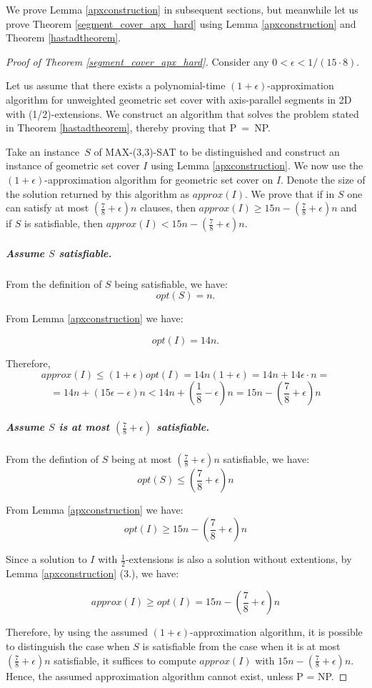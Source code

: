 We prove Lemma \ref{apxconstruction} in
subsequent sections, but meanwhile let us prove
Theorem \ref{segment_cover_apx_hard} using Lemma \ref{apxconstruction}
and Theorem \ref{hastadtheorem}.

\begin{proof}[Proof of Theorem \ref{segment_cover_apx_hard}]\leavevmode

Consider any $0 < \epsilon < 1/(15 \cdot 8)$.

Let us assume that there exists a polynomial-time
$(1+\epsilon)$-approximation algorithm
for unweighted geometric set cover with axis-parallel segments in 2D
with (1/2)-extensions.
We construct an algorithm that solves the problem stated in 
Theorem \ref{hastadtheorem}, thereby proving that P~=~NP.

Take an instance~$S$ of MAX-(3,3)-SAT to be distinguished
and construct an instance of geometric set cover $I$
using Lemma \ref{apxconstruction}.
We now use the $(1+\epsilon)$-approximation algorithm
for geometric set cover on $I$.
Denote the size of the solution returned by this algorithm as $approx(I)$.
We prove that 
if in $S$
one can satisfy at most $(\frac{7}{8}+\epsilon)n$ clauses,
then $approx(I) \ge 15n - (\frac{7}{8} + \epsilon)n$
and if $S$ is
satisfiable, then $approx(I) < 15n - (\frac{7}{8} + \epsilon)n$.

\subparagraph{Assume $S$ satisfiable.}
From the definition of $S$ being satisfiable, we have:
$$opt(S) = n.$$

From Lemma \ref{apxconstruction} we have:

$$opt(I) = 14n.$$

Therefore,
$$approx(I) \le (1+\epsilon)opt(I) = 14n(1+\epsilon)
	= 14n + 14\epsilon\cdot n =$$ 
	$$= 14n + (15\epsilon - \epsilon)n < 
  14n + \left(\frac{1}{8} - \epsilon\right)n 
= 15n - \left(\frac{7}{8} + \epsilon\right)n$$

\subparagraph{Assume $S$ is at most 
$\left(\frac{7}{8} + \epsilon\right)$ satisfiable.}
From the defintion of $S$ being at most 
$\left(\frac{7}{8} + \epsilon\right)n$ satisfiable, we have:
$$opt(S) \le \left(\frac{7}{8} + \epsilon\right)n$$

From Lemma \ref{apxconstruction} we have:
$$opt(I) \ge 15n - \left(\frac{7}{8} + \epsilon\right)n$$

Since a solution to $I$ with $\frac{1}{2}$-extensions is
also a solution without extentions, by 
Lemma \ref{apxconstruction} (3.), we have:

$$approx(I) \ge opt(I) = 15n - \left(\frac{7}{8} + \epsilon\right)n$$


Therefore, by using the assumed $(1+\epsilon)$-approximation
algorithm,
it is possible to distinguish the case when
$S$ is satisfiable from the case when it is
at most $(\frac{7}{8} + \epsilon)n$ satisfiable,
it suffices to compute $approx(I)$ with $15n - (\frac{7}{8}+\epsilon)n$.
Hence, the assumed approximation algorithm cannot exist, unless P = NP.
\end{proof}

